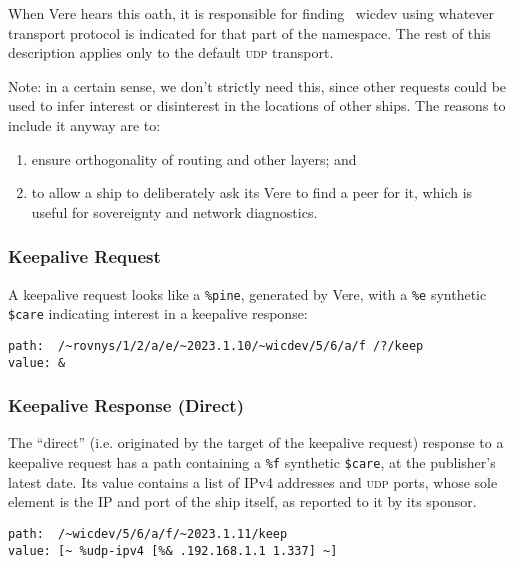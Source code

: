 \documentclass[twoside]{article}
\begin{document}
When Vere hears this oath, it is responsible for finding ~wicdev using whatever transport protocol is indicated for that part of the namespace. The rest of this description applies only to the default \textsc{udp} transport.

Note: in a certain sense, we don't strictly need this, since other requests could be used to infer interest or disinterest in the locations of other ships. The reasons to include it anyway are to:

\begin{enumerate}
  \item  ensure orthogonality of routing and other layers; and
  \item  to allow a ship to deliberately ask its Vere to find a peer for it, which is useful for sovereignty and network diagnostics.
\end{enumerate}

\subsubsection{Keepalive Request}

A keepalive request looks like a \lstinline[style=inlinecode]{%pine}, generated by Vere, with a \lstinline[style=inlinecode]{%e} synthetic \lstinline[style=inlinecode]{$care} indicating interest in a keepalive response:

\begin{lstlisting}[style=listingcode]
path:  /~rovnys/1/2/a/e/~2023.1.10/~wicdev/5/6/a/f /?/keep
value: &
\end{lstlisting}

\subsubsection{Keepalive Response (Direct)}

The ``direct'' (i.e. originated by the target of the keepalive request) response to a keepalive request has a path containing a \lstinline[style=inlinecode]{%f} synthetic \lstinline[style=inlinecode]{$care}, at the publisher's latest date. Its value contains a list of IPv4 addresses and \textsc{udp} ports, whose sole element is the IP and port of the ship itself, as reported to it by its sponsor.

\begin{lstlisting}[style=listingcode]
path:  /~wicdev/5/6/a/f/~2023.1.11/keep
value: [~ %udp-ipv4 [%& .192.168.1.1 1.337] ~]
\end{lstlisting}
\end{document}
